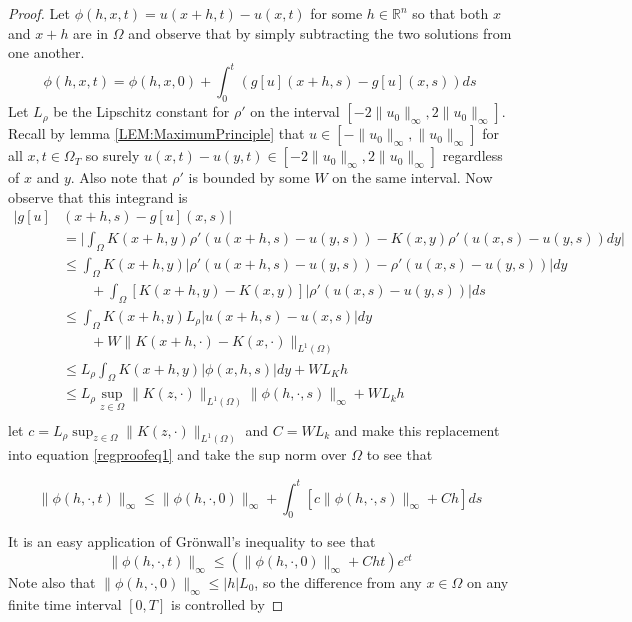 \documentclass[aps,
preprint,
groupedaddress,
showkeys,
amsmath]{revtex4-2}
\begin{document}
    \begin{proof}
        Let $\phi(h,x,t)=u(x+h,t)-u(x,t)$ for some $h\in  \mathbb{R}^n$ so that both $x$ and $x+h$ are in $\Omega$  and observe that by simply subtracting the two solutions from one another.
        \begin{equation}\label{regproofeq1}
            \phi(h,x,t)=\phi(h,x,0)+\int_0^t\left(g[u](x+h,s)-g[u](x,s)\right)ds
        \end{equation}
        Let $L_\rho$ be the Lipschitz constant for $\rho'$ on the interval $[-2\|u_0\|_\infty,2\|u_0\|_\infty]$. Recall by lemma \ref{LEM:MaximumPrinciple} that $u\in [-\|u_0\|_\infty,\|u_0\|_\infty]$ for all $x,t\in \Omega_T$ so surely $u(x,t)-u(y,t)\in [-2\|u_0\|_\infty,2\|u_0\|_\infty]$ regardless of $x$ and $y$. Also note that $\rho'$ is bounded by some $W$ on the same interval. Now observe that this integrand is
        \begin{equation*}
            \begin{split}
                |g[u]&(x+h,s)-g[u](x,s)|\\
                &=\bigg|\int_\Omega K(x+h,y)\rho'(u(x+h,s)-u(y,s))-K(x,y)\rho'(u(x,s)-u(y,s))dy\bigg|\\
                &\leq \int_\Omega K(x+h,y)|\rho'(u(x+h,s)-u(y,s))-\rho'(u(x,s)-u(y,s))|dy\\
                &\quad \quad +\int_\Omega [K(x+h,y)-K(x,y)]|\rho'(u(x,s)-u(y,s))|ds\\
                &\leq \int_\Omega K(x+h,y)L_\rho|u(x+h,s)-u(x,s)|dy\\
                &\quad\quad+W\|K(x+h,\cdot)-K(x,\cdot)\|_{L^1(\Omega)}\\
                &\leq L_\rho\int_\Omega K(x+h,y)|\phi(x,h,s)|dy+WL_Kh\\
                & \leq L_\rho\sup_{z\in \Omega}\|K(z,\cdot)\|_{L^1(\Omega)}\|\phi(h,\cdot,s)\|_{\infty}+WL_kh\\
            \end{split}
        \end{equation*}
        let $c=L_\rho\sup_{z\in \Omega}\|K(z,\cdot)\|_{L^1(\Omega)}$ and $C=WL_k$ and make this replacement into equation \eqref{regproofeq1}  and take the sup norm over $\Omega$ to see that
        
       \[\|\phi(h,\cdot,t)\|_\infty \leq \|\phi(h,\cdot,0)\|_\infty +\int_0^t[c\|\phi(h,\cdot, s)\|_\infty +Ch]ds\]
        
        It is an easy application of Gr\"onwall's inequality to see that
        \begin{equation*}
             \|\phi(h,\cdot,t)\|_\infty
             \leq(\|\phi(h,\cdot, 0)\|_\infty+Cht)e^{ct}
        \end{equation*}
        Note also that $\|\phi(h,\cdot,0)\|_\infty\leq |h|L_0$, so the difference from any $x\in \Omega$ on any finite time interval $[0,T]$ is controlled by
        

\end{proof}
\end{document}
